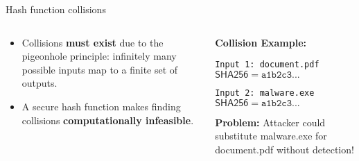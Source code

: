 \documentclass[aspectratio=169, lualatex, handout]{beamer}
\begin{document}
\begin{frame}{Hash function collisions}
	\begin{columns}[c]
		\begin{column}{0.55\textwidth}
			\begin{itemize}
				\item Collisions \textbf{must exist} due to the pigeonhole principle:
				      infinitely many possible inputs map to a finite set of outputs.
				\item A secure hash function makes finding collisions \textbf{computationally infeasible}.
			\end{itemize}
		\end{column}
		\begin{column}{0.45\textwidth}
			\begin{tcolorbox}[colback=black!5!white,colframe=ciphergray]
				\textbf{Collision Example:}

				\vspace{0.2cm}

				\texttt{Input 1: document.pdf}\\
				$\mathsf{SHA256} = \texttt{a1b2c3...}$

				\vspace{0.2cm}

				\texttt{Input 2: malware.exe}\\
				$\mathsf{SHA256} = \texttt{a1b2c3...}$

				\vspace{0.2cm}

				\textcolor{cipherprimary}{\textbf{Problem:} \small Attacker could substitute malware.exe for document.pdf without detection!}
			\end{tcolorbox}
		\end{column}
	\end{columns}
\end{frame}
\end{document}
